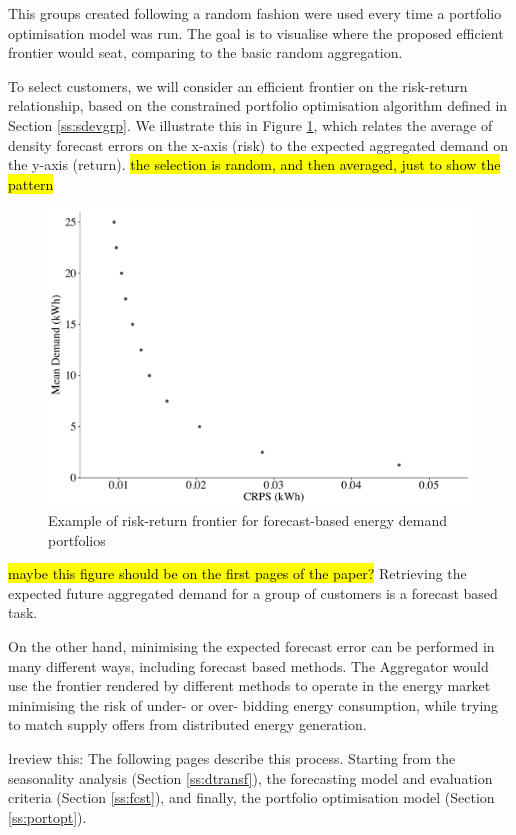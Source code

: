 \documentclass[review, 3p, 12pt, authoryear]{elsarticle}
\begin{document}
This groups created following a random fashion were used every time a portfolio optimisation model was run.
The goal is to visualise where the proposed efficient frontier would seat, comparing to the basic random aggregation.

To select customers, we will consider an efficient frontier on the risk-return relationship, based on the constrained portfolio optimisation algorithm defined in Section \ref{ss:sdevgrp}. We illustrate this in Figure \ref{fig:portoptex}, which relates the average of density forecast errors on the x-axis (risk) to the expected aggregated demand on the y-axis (return). \hl{the selection is random, and then averaged, just to show the pattern}

\begin{figure}
  \centering
  \includegraphics[width=0.8\columnwidth]{2017-11-15_randomgrouping}
  \caption{Example of risk-return frontier for forecast-based energy demand portfolios}
  \label{fig:portoptex}
\end{figure}
\hl{maybe this figure should be on the first pages of the paper?}
Retrieving the expected future aggregated demand for a group of customers is a forecast based task.

On the other hand, minimising the expected forecast error can be performed in many different ways, including forecast based methods.
The Aggregator would use the frontier rendered by different methods to operate in the energy market minimising the risk of under- or over- bidding energy consumption, while trying to match supply offers from distributed energy generation.

\l{review this:} The following pages describe this process. Starting from the seasonality analysis (Section \ref{ss:dtransf}), the forecasting model and evaluation criteria (Section \ref{ss:fcst}), and finally, the portfolio optimisation model (Section \ref{ss:portopt}).
\end{document}
